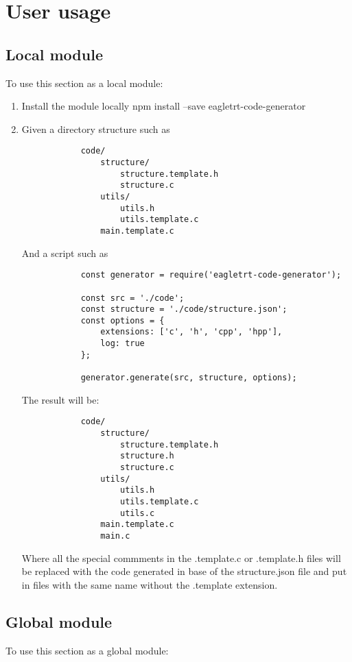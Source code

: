 \section{\huge{User usage}}

\subsection{Local module}
To use this section as a local module:

\begin{enumerate}
    \item Install the module locally npm install --save eagletrt-code-generator
    \item Given a directory structure such as
        \begin{verbatim}
            code/
                structure/
                    structure.template.h
                    structure.c
                utils/
                    utils.h
                    utils.template.c
                main.template.c
        \end{verbatim}
        And a script such as
        \begin{verbatim}
            const generator = require('eagletrt-code-generator');

            const src = './code';
            const structure = './code/structure.json';
            const options = {
                extensions: ['c', 'h', 'cpp', 'hpp'],
                log: true
            };

            generator.generate(src, structure, options);
        \end{verbatim}
        The result will be:
        \begin{verbatim}
            code/
                structure/
                    structure.template.h
                    structure.h
                    structure.c
                utils/
                    utils.h
                    utils.template.c
                    utils.c
                main.template.c
                main.c
        \end{verbatim}
        Where all the special commments in the .template.c or .template.h files will be replaced with the code generated in base of the structure.json file and put in files with the same name without the .template extension.
\end{enumerate}

\subsection{Global module}
To use this section as a global module:

